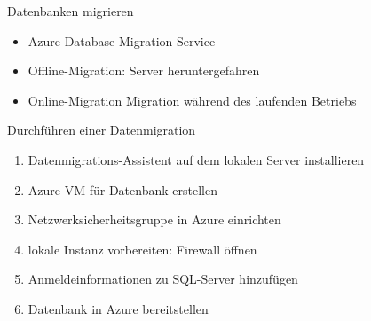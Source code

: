 \begin{flashcard}[Definition]{Datenbanken migrieren}
    \begin{itemize}
        \item Azure Database Migration Service
        \item Offline-Migration:\newline
            Server heruntergefahren
        \item Online-Migration\newline
            Migration während des laufenden Betriebs
    \end{itemize}
\end{flashcard}

\begin{flashcard}[Definition]{Durchführen einer Datenmigration}
    \begin{enumerate}
        \item Datenmigrations-Assistent auf dem lokalen Server installieren
        \item Azure VM für Datenbank erstellen
        \item Netzwerksicherheitsgruppe in Azure einrichten
        \item lokale Instanz vorbereiten: Firewall öffnen
        \item Anmeldeinformationen zu SQL-Server hinzufügen
        \item Datenbank in Azure bereitstellen
    \end{enumerate}
\end{flashcard}
